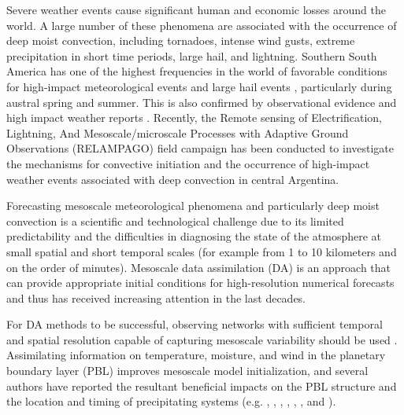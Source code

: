\documentclass[preprint, 3p, authoryear,review, 12pt]{elsarticle} %
\begin{document}
Severe weather events cause significant human and economic losses around the world. A large number of these phenomena are associated with the occurrence of deep moist convection, including tornadoes, intense wind gusts, extreme precipitation in short time periods, large hail, and lightning.
Southern South America has one of the highest frequencies in the world of favorable conditions for high-impact meteorological events \citep{brooks2003} and large hail events \citep{cecil2012}, particularly during austral spring and summer.
This is also confirmed by observational evidence and high impact weather reports \citep{matsudo2015, rasmussen2014}. Recently, the Remote sensing of Electrification, Lightning, And Mesoscale/microscale Processes with Adaptive Ground Observations (RELAMPAGO) field campaign \citep{nesbitt2021} has been conducted to investigate the mechanisms for convective initiation and the occurrence of high-impact weather events associated with deep convection in central Argentina.

Forecasting mesoscale meteorological phenomena and particularly deep moist convection is a scientific and technological challenge due to its limited predictability and the difficulties in diagnosing the state of the atmosphere at small spatial and short temporal scales (for example from 1 to 10 kilometers and on the order of minutes). Mesoscale data assimilation (DA) is an approach that can provide appropriate initial conditions for high-resolution numerical forecasts \citep{sun2014} and thus has received increasing attention in the last decades.

For DA methods to be successful, observing networks with sufficient temporal and spatial resolution capable of capturing mesoscale variability should be used \citep{gustafsson2018}. Assimilating information on temperature, moisture, and wind in the planetary boundary layer (PBL) improves mesoscale model initialization, and several authors have reported the resultant beneficial impacts on the PBL structure and the location and timing of precipitating systems (e.g. \citet{wheatley2010}, \citet{ha2014}, \citet{chang2017}, \citet{bae2022}, \citet{banos2021}, \citet{maejima2019}, and \citet{chen2016}).
\end{document}
